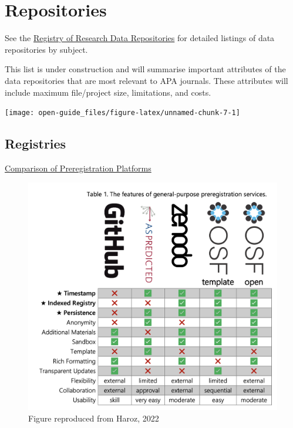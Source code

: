 \documentclass[
  oneside]{book}
\begin{document}
\hypertarget{repositories}{%
\chapter{Repositories}\label{repositories}}

See the \href{https://www.re3data.org/}{Registry of Research Data Repositories} for detailed listings of data repositories by subject.

This list is under construction and will summarise important attributes of the data repositories that are most relevant to APA journals. These attributes will include maximum file/project size, limitations, and costs.

\begin{center}\texttt{[image: open-guide\_files/figure-latex/unnamed-chunk-7-1]} \end{center}

\hypertarget{registries}{%
\section{Registries}\label{registries}}

\href{https://osf.io/preprints/metaarxiv/zry2u}{Comparison of Preregistration Platforms} \citep{haroz_2022}

\begin{figure}

{\centering \includegraphics[width=1\linewidth]{images/reg-repos-haroz} 

}

\caption{Figure reproduced from Haroz, 2022}\label{fig:unnamed-chunk-8}
\end{figure}
\end{document}
